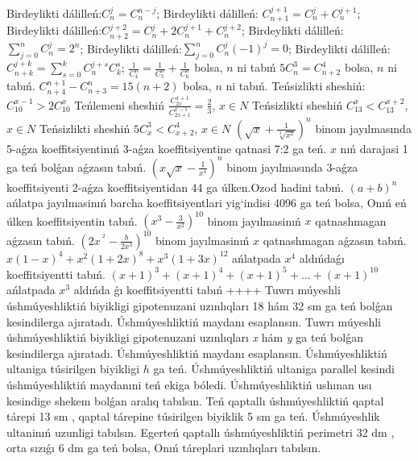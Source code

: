 Birdeylikti dálilleń:\(C_{n}^{j} = C_{n}^{n - j}\);
Birdeylikti dálilleń: \(C_{n + 1}^{j + 1} = C_{n}^{j} + C_{n}^{j + 1}\);
Birdeylikti dálilleń:\(C_{n + 2}^{j + 2} = C_{n}^{j} + 2C_{n}^{j + 1} + C_{n}^{j + 2}\);
Birdeylikti dálilleń: \(\sum_{j = 0}^{n}C_{n}^{j} = 2^{n}\);
Birdeylikti dálilleń:\(\sum_{j = 0}^{n}C_{n}^{j}( - 1)^{j} = 0\);
Birdeylikti dálilleń: \(C_{n + k}^{j + k} = \sum_{s = 0}^{k}C_{n}^{j + s}C_{k}^{s}\);
\(\frac{1}{C_{4}^{n}} = \frac{1}{C_{5}^{n}} + \frac{1}{C_{6}^{n}}\) bolsa, \(n\) ni tabıń
\(5C_{n}^{3} = C_{n + 2}^{4}\) bolsa, \(n\) ni tabıń.
\(C_{n + 4}^{n + 1} - C_{n + 3}^{n} = 15(n + 2)\) bolsa, \(n\) ni tabıń.
Teńsizlikti sheshiń: \(C_{10}^{x - 1} > 2C_{10}^{x}\)
Teńlemeni sheshiń \(\frac{C_{2x}^{x + 1}}{C_{2x + 1}^{x - 1}} = \frac{2}{3}\), \(x \in N\)
Teńsizlikti sheshiń \(C_{13}^{x} < C_{13}^{x + 2}\), \(x \in N\)
Teńsizlikti sheshiń \(5C_{x}^{3} < C_{x + 2}^{4}\), \(x \in N\)
\(\left( \sqrt{x} + \frac{1}{\sqrt[3]{x^{2}}} \right)^{n}\) binom jayılmasında 5-aǵza koeffitsiyentinıń 3-aǵza koeffitsiyentine qatnasi 7:2 ga teń. \(x\) nıń darajasi 1 ga teń bolǵan aǵzasın tabıń.
\(\left( x\sqrt{x} - \frac{1}{x^{4}} \right)^{n}\) binom jayılmasında 3-aǵza koeffitsiyenti 2-aǵza koeffitsiyentidan 44 ga úlken.Ozod hadini tabıń.
\((a + b)^{n}\) ańlatpa jayılmasinıń barcha koeffitsiyentlari yig`indisi 4096 ga teń bolsa, Onıń eń úlken koeffitsiyentin tabıń.
\(\left( x^{3} - \frac{3}{x^{2}} \right)^{10}\) binom jayılmasinıń \(x\) qatnashmagan aǵzasın tabıń.
\(\left( 2x^{\ ^{2}} - \frac{b}{2x^{3}} \right)^{10}\) binom jayılmasinıń \(x\) qatnashmagan aǵzasın tabıń.
\(x(1 - x)^{4} + x^{2}(1 + 2x)^{8} + x^{3}(1 + 3x)^{12}\) ańlatpada \(x^{4}\) aldıńdaǵı koeffitsiyentti tabıń.
\((x + 1)^{3} + (x + 1)^{4} + (x + 1)^{5} + ... + (x + 1)^{10}\) ańlatpada \(x^{3}\) aldıńda ǵı koeffitsiyentti tabıń
++++
Tuwrı múyeshli úshmúyeshliktiń biyikligi gipotenuzani uzınlıqları 18 hám 32 sm ga teń bolǵan kesindilerga ajıratadı. Úshmúyeshliktiń maydanı esaplansın.
Tuwrı múyeshli úshmúyeshliktiń biyikligi gipotenuzani uzınlıqları \emph{x} hám \emph{y} ga teń bolǵan kesindilerga ajıratadı. Úshmúyeshliktiń maydanı esaplansın.
Úshmúyeshliktiń ultaniga túsirilgen biyikligi \(h\) ga teń. Úshmúyeshliktiń ultaniga parallel kesindi úshmúyeshliktiń maydanıni teń ekiga bóledi. Úshmúyeshliktiń ushınan usı kesindige shekem bolǵan aralıq tabılsın.
Teń qaptallı úshmúyeshliktiń qaptal tárepi 13 sm , qaptal tárepine túsirilgen biyiklik 5 sm ga teń. Úshmúyeshlik ultaninıń uzunligi tabılsın.
Egerteń qaptallı úshmúyeshliktiń perimetri 32 dm , orta sızıǵı 6 dm ga teń bolsa, Onıń táreplari uzınlıqları tabılsın.
